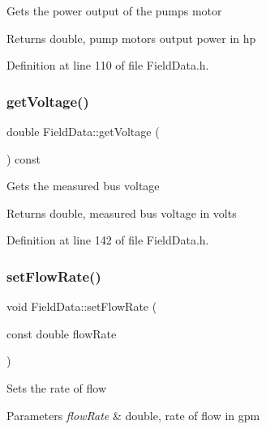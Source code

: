 Gets the power output of the pump\textquotesingle{}s motor \begin{DoxyReturn}{Returns}
double, pump motor\textquotesingle{}s output power in hp 
\end{DoxyReturn}


Definition at line 110 of file Field\+Data.\+h.

\mbox{\label{class_field_data_a1e8a55965e6cbd8c7b49c0dd5fbee002}} 
\subsubsection{\texorpdfstring{get\+Voltage()}{getVoltage()}}
{\footnotesize\ttfamily double Field\+Data\+::get\+Voltage (\begin{DoxyParamCaption}{ }\end{DoxyParamCaption}) const\hspace{0.3cm}{\ttfamily [inline]}}

Gets the measured bus voltage \begin{DoxyReturn}{Returns}
double, measured bus voltage in volts 
\end{DoxyReturn}


Definition at line 142 of file Field\+Data.\+h.

\mbox{\label{class_field_data_a35231cce497c4b69b683d76dd2c78991}} 
\subsubsection{\texorpdfstring{set\+Flow\+Rate()}{setFlowRate()}}
{\footnotesize\ttfamily void Field\+Data\+::set\+Flow\+Rate (\begin{DoxyParamCaption}\item[{const double}]{flow\+Rate }\end{DoxyParamCaption})\hspace{0.3cm}{\ttfamily [inline]}}

Sets the rate of flow 
\begin{DoxyParams}{Parameters}
{\em flow\+Rate} & double, rate of flow in gpm \\
\hline
\end{DoxyParams}


